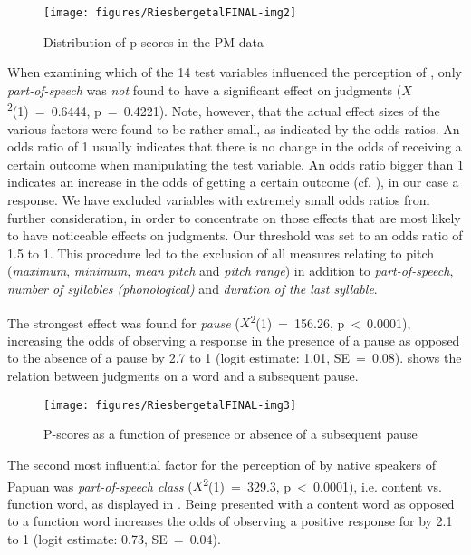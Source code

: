 \documentclass[output=paper
,modfonts
,nonflat]{langsci/langscibook}
\begin{document}
\begin{figure}
	\texttt{[image: figures/RiesbergetalFINAL-img2]}
	\caption{Distribution of p-scores in the PM data}
	\label{f:riesberg:2}
\end{figure}

When examining which of the 14 test variables influenced the perception of , only \textit{part-of-speech} was \textit{not} found to have a significant effect on  judgments (\textit{$X$}\textsuperscript{2}(1)~=~0.6444, p~=~0.4221). Note, however, that the actual effect sizes of the various factors were found to be rather small, as indicated by the odds ratios. An odds ratio of 1 usually indicates that there is no change in the odds of receiving a certain outcome when manipulating the test variable. An odds ratio bigger than 1 indicates an increase in the odds of getting a certain outcome (cf. \citealt[320, 923]{Field2012}), in our case a  response. We have excluded variables with extremely small odds ratios from further consideration, in order to concentrate on those effects that are most likely to have noticeable effects on  judgments. Our threshold was set to an odds ratio of 1.5 to 1. This procedure led to the exclusion of all measures relating to pitch (\textit{maximum}, \textit{minimum}, \textit{mean} \textit{pitch} and \textit{pitch} \textit{range}) in addition to \textit{part-of-speech}, \textit{number of syllables (phonological)} and \textit{duration of the last syllable}.

The strongest effect was found for \textit{pause} (\textit{$X$}\textsuperscript{2}(1)~=~156.26, p~<~0.0001), increasing the odds of observing a  response in the presence of a pause as opposed to the absence of a pause by 2.7 to 1 (logit estimate: 1.01, SE~=~0.08).  shows the relation between  judgments on a word and a subsequent pause.

\begin{figure}
		\texttt{[image: figures/RiesbergetalFINAL-img3]}
		\caption{P-scores as a function of presence or absence of a subsequent pause}
		\label{f:riesberg:3}
\end{figure}

\noindent
The second most influential factor for the perception of  by native speakers of Papuan  was \textit{part-of-speech class} (\textit{$X$}\textsuperscript{2}(1)~=~329.3, p~<~0.0001), i.e. content vs. function word, as displayed in . Being presented with a content word as opposed to a function word increases the odds of observing a positive response for  by 2.1 to 1 (logit estimate: 0.73, SE~=~0.04).
\end{document}
